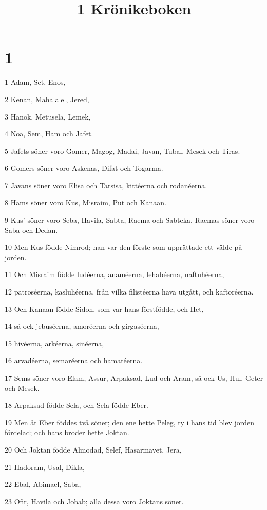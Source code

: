 

\title{1 Krönikeboken}


\chapter{1}

\par 1 Adam, Set, Enos,
\par 2 Kenan, Mahalalel, Jered,
\par 3 Hanok, Metusela, Lemek,
\par 4 Noa, Sem, Ham och Jafet.
\par 5 Jafets söner voro Gomer, Magog, Madai, Javan, Tubal, Mesek och Tiras.
\par 6 Gomers söner voro Askenas, Difat och Togarma.
\par 7 Javans söner voro Elisa och Tarsisa, kittéerna och rodanéerna.
\par 8 Hams söner voro Kus, Misraim, Put och Kanaan.
\par 9 Kus' söner voro Seba, Havila, Sabta, Raema och Sabteka. Raemas söner voro Saba och Dedan.
\par 10 Men Kus födde Nimrod; han var den förste som upprättade ett välde på jorden.
\par 11 Och Misraim födde ludéerna, anaméerna, lehabéerna, naftuhéerna,
\par 12 patroséerna, kasluhéerna, från vilka filistéerna hava utgått, och kaftoréerna.
\par 13 Och Kanaan födde Sidon, som var hans förstfödde, och Het,
\par 14 så ock jebuséerna, amoréerna och girgaséerna,
\par 15 hivéerna, arkéerna, sinéerna,
\par 16 arvadéerna, semaréerna och hamatéerna.
\par 17 Sems söner voro Elam, Assur, Arpaksad, Lud och Aram, så ock Us, Hul, Geter och Mesek.
\par 18 Arpaksad födde Sela, och Sela födde Eber.
\par 19 Men åt Eber föddes två söner; den ene hette Peleg, ty i hans tid blev jorden fördelad; och hans broder hette Joktan.
\par 20 Och Joktan födde Almodad, Selef, Hasarmavet, Jera,
\par 21 Hadoram, Usal, Dikla,
\par 22 Ebal, Abimael, Saba,
\par 23 Ofir, Havila och Jobab; alla dessa voro Joktans söner.
